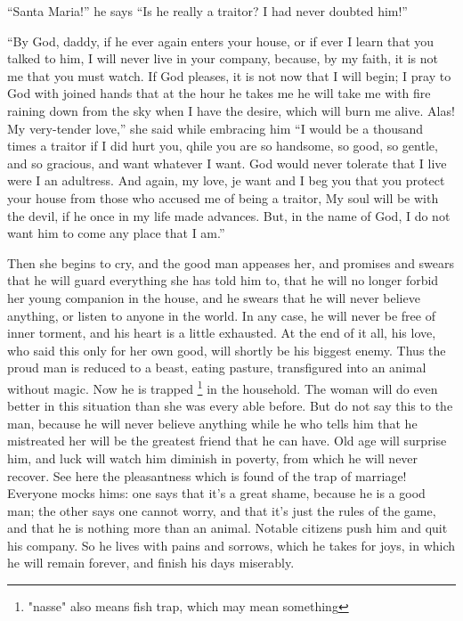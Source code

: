 \documentclass{book}
\begin{document}
``Santa Maria!'' he says ``Is he really a traitor? I had never doubted him!''

``By God, daddy, if he ever again enters your house, or if ever I learn that you talked to him, I will never live in your company, because, by my faith, it is not me that you must watch. If God pleases, it is not now that I will begin; I pray to God with joined hands that at the hour he takes me he will take me with fire raining down from the sky when I have the desire, which will burn me alive. Alas! My very-tender love,'' she said while embracing him ``I would be a thousand times a traitor if I did hurt you, qhile you are so handsome, so good, so gentle, and so gracious, and want whatever I want. God would never tolerate that I live were I an adultress. And again, my love, je want and I beg you that you protect your house from those who accused me of being a traitor, My soul will be with the devil, if he once in my life made advances. But, in the name of God, I do not want him to come any place that I am.''

Then she begins to cry, and the good man appeases her, and promises and swears that he will guard everything she has told him to, that he will no longer forbid her young companion in the house, and he swears that he will never believe anything, or listen to anyone in the world. In any case, he will never be free of inner torment, and his heart is a little exhausted. At the end of it all, his love, who said this only for her own good, will shortly be his biggest enemy. Thus the proud man is reduced to a beast, eating pasture, transfigured into an animal without magic. Now he is trapped
\footnote{"nasse" also means fish trap, which may mean something}
in the household. The woman will do even better in this situation than she was every able before. But do not say this to the man, because he will never believe anything while he who tells him that he mistreated her will be the greatest friend that he can have. Old age will surprise him, and luck will watch him diminish in poverty, from which he will never recover. See here the pleasantness which is found of the trap of marriage! Everyone mocks hims: one says that it's a great shame, because he is a good man; the other says one cannot worry, and that it's just the rules of the game, and that he is nothing more than an animal. Notable citizens push him and quit his company. So he lives with pains and sorrows, which he takes for joys, in which he will remain forever, and finish his days miserably. 
\end{document}
